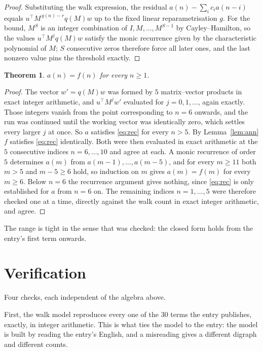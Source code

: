 \documentclass[11pt,a4paper]{article}
\theoremstyle{plain}
\newtheorem{theorem}{Theorem}
\theoremstyle{definition}
\begin{document}
\begin{proof}
Substituting the walk expression, the residual $a(n)-\sum_ic_ia(n-i)$ equals
$u^{\!\top}M^{\,g(n)-r}q(M)w$ up to the fixed linear reparametrisation $g$. For the bound,
$M^{S}$ is an integer combination of $I,M,\dots,M^{S-1}$ by Cayley--Hamilton, so the values
$u^{\!\top}M^{j}q(M)w$ satisfy the monic recurrence given by the characteristic polynomial of
$M$; $S$ consecutive zeros therefore force all later ones, and the last nonzero value pins the
threshold exactly.
\end{proof}

\begin{theorem}
$a(n)=f(n)$ for every $n\ge1$.
\end{theorem}

\begin{proof}
The vector $w'=q(M)w$ was formed by $5$ matrix--vector products in exact integer
arithmetic, and $u^{\!\top}M^{j}w'$ evaluated for $j=0,1,\dots$, again exactly. Those integers
vanish from the point corresponding to $n=6$ onwards, and the run was continued until the
working vector was identically zero, which settles every larger $j$ at once. So $a$ satisfies
\eqref{eq:rec} for every $n>5$. By Lemma~\ref{lem:ann} $f$ satisfies \eqref{eq:rec}
identically. Both were then evaluated in exact arithmetic at the $5$ consecutive indices
$n=6,\dots,10$ and agree at each. A monic recurrence of order $5$
determines $a(m)$ from $a(m-1),\dots,a(m-5)$, and for every $m\ge11$ both
$m>5$ and $m-5\ge6$ hold, so induction on $m$ gives $a(m)=f(m)$ for every
$m\ge6$.
Below $n=6$ the recurrence argument gives nothing, since \eqref{eq:rec} is only
established for $a$ from $n=6$ on. The remaining indices $n=1,\dots,5$ were
therefore checked one at a time, directly against the walk count in exact integer arithmetic,
and agree.
\end{proof}

The range is tight in the sense that was checked: the closed form holds from the entry's first term onwards.

\section{Verification}

Four checks, each independent of the algebra above.

First, the walk model reproduces every one of the $30$ terms the entry publishes,
exactly, in integer arithmetic. This is what ties the model to the entry: the model is built
by reading the entry's English, and a misreading gives a different digraph and different
counts.
\end{document}
